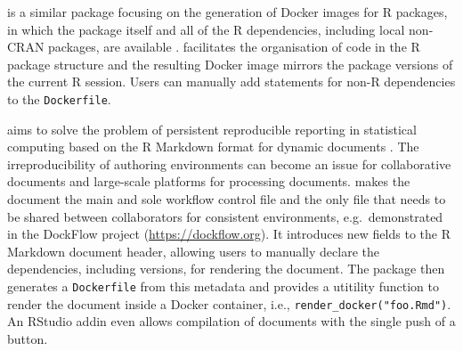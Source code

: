 \textbf{} is a similar package focusing on the generation
of Docker images for R packages, in which the package itself and all of
the R dependencies, including local non-CRAN packages, are available
\citep{cran_dockr,kjeldgaard_dockr_2019}.  facilitates the
organisation of code in the R package structure and the resulting Docker
image mirrors the package versions of the current R session. Users can
manually add statements for non-R dependencies to the
\texttt{Dockerfile}.

\textbf{} aims to solve the problem of persistent
reproducible reporting in statistical computing based on the R Markdown
format \citep{xie2018} for dynamic documents
\citep[\href{https://nanx.me/liftr/}{https://nanx.me/liftr/}, ][]{liftr2019}.
The irreproducibility of authoring environments can become an issue for
collaborative documents and large-scale platforms for processing
documents.  makes the document the main and sole workflow
control file and the only file that needs to be shared between
collaborators for consistent environments, e.g.~demonstrated in the
DockFlow project (\url{https://dockflow.org}). It introduces new fields
to the R Markdown document header, allowing users to manually declare
the dependencies, including versions, for rendering the document. The
package then generates a \texttt{Dockerfile} from this metadata and
provides a utitility function to render the document inside a Docker
container, i.e., \texttt{render\_docker("foo.Rmd")}. An RStudio addin
even allows compilation of documents with the single push of a button.

